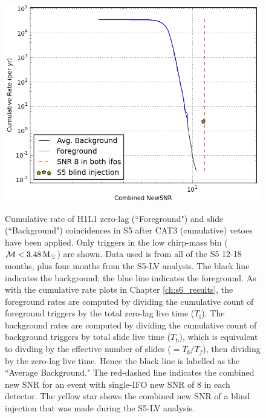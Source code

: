 \begin{figure}[p]
\center
\includegraphics[width=6in]{figures/ligo_south/Cat3-newsnr-low_mass.png}
\label{fig:ligo_south-cat3_newsnr}
\caption{Cumulative rate of H1L1 zero-lag (``Foreground") and slide (``Background") coincidences in \ac{S5} after CAT3 (cumulative) vetoes have been applied. Only triggers in the low chirp-mass bin ($\mathcal{M} < 3.48\,\mathrm{M_\odot}$) are shown. Data used is from all of the \ac{S5} 12-18 months, plus four months from the \ac{S5}-LV analysis. The black line indicates the background; the blue line indicates the foreground. As with the cumulative rate plots in Chapter \ref{ch:s6_results}, the foreground rates are computed by dividing the cumulative count of foreground triggers by the total zero-lag live time ($T_{\mathrm{f}}$). The background rates are computed by dividing the cumulative count of background triggers by total slide live time ($T_{\mathrm{b}}$), which is equivalent to divding by the effective number of slides ($= T_{b}/T_{f}$), then dividing by the zero-lag live time. Hence the black line is labelled as the ``Average Background." The red-dashed line indicates the combined new \ac{SNR} for an event with single-\ac{IFO} new \ac{SNR} of $8$ in each detector. The yellow star shows the combined new \ac{SNR} of a blind injection that was made during the \ac{S5}-LV analysis.}
\end{figure}

